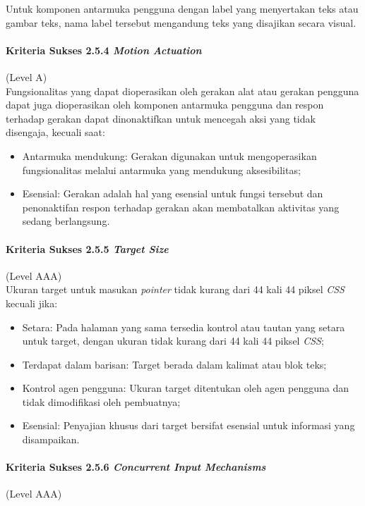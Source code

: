 Untuk komponen antarmuka pengguna dengan label yang menyertakan teks atau gambar teks, nama label tersebut mengandung teks yang disajikan secara visual. 

\paragraph{Kriteria Sukses 2.5.4 \textit{Motion Actuation}}
\label{sec:kriteria_sukses_2.5.4}
(Level A)\\

Fungsionalitas yang dapat dioperasikan oleh gerakan alat atau gerakan pengguna dapat juga dioperasikan oleh komponen antarmuka pengguna dan respon terhadap gerakan dapat dinonaktifkan untuk mencegah aksi yang tidak disengaja, kecuali saat:
\begin{itemize}
	\item Antarmuka mendukung: Gerakan digunakan untuk mengoperasikan fungsionalitas melalui antarmuka yang mendukung aksesibilitas;
	\item Esensial: Gerakan adalah hal yang esensial untuk fungsi tersebut dan penonaktifan respon terhadap gerakan akan membatalkan aktivitas yang sedang berlangsung.
\end{itemize}

\paragraph{Kriteria Sukses 2.5.5 \textit{Target Size}}
\label{sec:kriteria_sukses_2.5.5}
(Level AAA)\\

Ukuran target untuk masukan \textit{pointer} tidak kurang dari 44 kali 44 piksel \textit{CSS} kecuali jika:

\begin{itemize}
	\item Setara: Pada halaman yang sama tersedia kontrol atau tautan yang setara untuk target, dengan ukuran tidak kurang dari 44 kali 44 piksel \textit{CSS};  
	\item Terdapat dalam barisan: Target berada dalam kalimat atau blok teks;
	\item Kontrol agen pengguna: Ukuran target ditentukan oleh agen pengguna dan tidak dimodifikasi oleh pembuatnya;
	\item Esensial: Penyajian khusus dari target bersifat esensial untuk informasi yang disampaikan.
\end{itemize}

\paragraph{Kriteria Sukses 2.5.6 \textit{Concurrent Input Mechanisms}}
\label{sec:kriteria_sukses_2.5.6}
(Level AAA)\\

